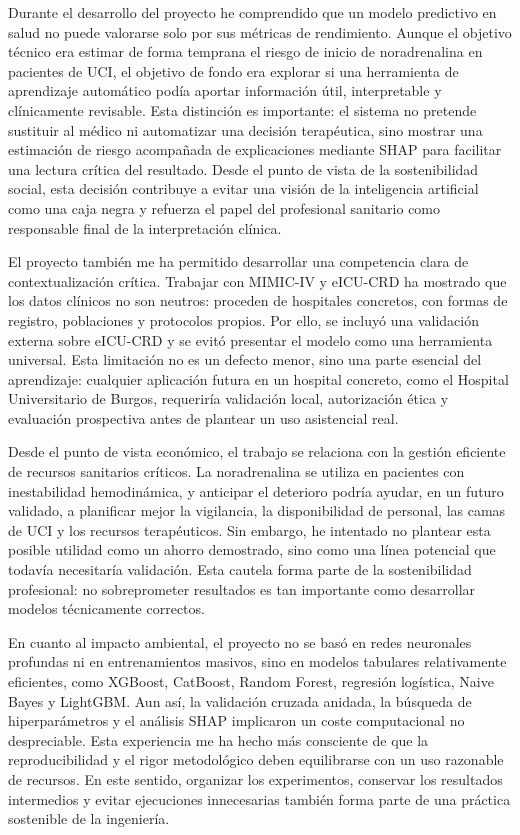 \documentclass[
  spanish,
  a4paper,
  12pt,
  twoside]{memoir}
\begin{document}
Durante el desarrollo del proyecto he comprendido que un modelo predictivo en salud no puede valorarse solo por sus métricas de rendimiento. Aunque el objetivo técnico era estimar de forma 
temprana el riesgo de inicio de noradrenalina en pacientes de UCI, el objetivo de fondo era explorar si una herramienta de aprendizaje automático podía aportar información útil, interpretable y
 clínicamente revisable. Esta distinción es importante: el sistema no pretende sustituir al médico ni automatizar una decisión terapéutica, sino mostrar una estimación de riesgo acompañada de 
 explicaciones mediante SHAP para facilitar una lectura crítica del resultado. Desde el punto de vista de la sostenibilidad social, esta decisión contribuye a evitar una visión de la inteligencia
  artificial como una caja negra y refuerza el papel del profesional sanitario como responsable final de la interpretación clínica.

El proyecto también me ha permitido desarrollar una competencia clara de contextualización crítica. Trabajar con MIMIC-IV y eICU-CRD ha mostrado que los datos clínicos no son neutros: 
proceden de hospitales concretos, con formas de registro, poblaciones y protocolos propios. Por ello, se incluyó una validación externa sobre eICU-CRD y se evitó presentar el modelo como una 
herramienta universal. Esta limitación no es un defecto menor, sino una parte esencial del aprendizaje: cualquier aplicación futura en un hospital concreto, como el Hospital Universitario de
 Burgos, requeriría validación local, autorización ética y evaluación prospectiva antes de plantear un uso asistencial real.

Desde el punto de vista económico, el trabajo se relaciona con la gestión eficiente de recursos sanitarios críticos. La noradrenalina se utiliza en pacientes con inestabilidad hemodinámica, y
 anticipar el deterioro podría ayudar, en un futuro validado, a planificar mejor la vigilancia, la disponibilidad de personal, las camas de UCI y los recursos terapéuticos. Sin embargo, he 
 intentado no plantear esta posible utilidad como un ahorro demostrado, sino como una línea potencial que todavía necesitaría validación. Esta cautela forma parte de la sostenibilidad
  profesional: no sobreprometer resultados es tan importante como desarrollar modelos técnicamente correctos.

En cuanto al impacto ambiental, el proyecto no se basó en redes neuronales profundas ni en entrenamientos masivos, sino en modelos tabulares relativamente eficientes, como XGBoost, CatBoost,
 Random Forest, regresión logística, Naive Bayes y LightGBM. Aun así, la validación cruzada anidada, la búsqueda de hiperparámetros y el análisis SHAP implicaron un coste computacional no
  despreciable. Esta experiencia me ha hecho más consciente de que la reproducibilidad y el rigor metodológico deben equilibrarse con un uso razonable de recursos. En este sentido, organizar los
 experimentos, conservar los resultados intermedios y evitar ejecuciones innecesarias también forma parte de una práctica sostenible de la ingeniería.
\end{document}
